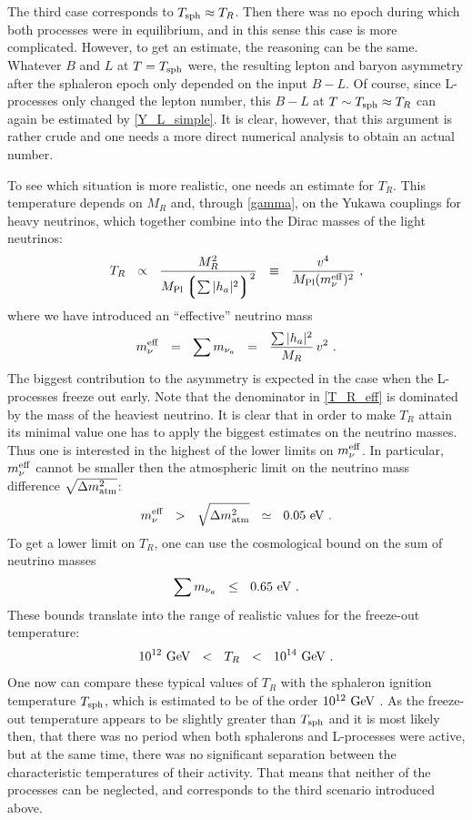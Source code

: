 \documentclass[12pt]{revtex4}
\newcommand{\lgr}{\left\lgroup}
\newcommand{\rgr}{\right\rgroup}
\newcommand{\Mpl}{M_{\rm Pl}}
\newcommand{\Tsph}{T_{\rm sph}}
\newcommand{\meff}{m^{\rm eff}_\nu}
\newcommand{\GeV}{{\rm GeV}}
\newcommand{\eV}{{\rm eV}}
\begin{document}
	The third case corresponds to $ \Tsph \approx T_R $.
	Then there was no epoch during which both processes
	were in equilibrium, and in this sense this case is more complicated.
	However, to get an estimate, the reasoning can be 
	the same.
	Whatever $ B $ and $ L $ at $ T = \Tsph $ were, the resulting
	lepton and baryon asymmetry after the sphaleron epoch only
	depended on the input $ B - L $.
	Of course, since L-processes only changed the lepton number,
	this $ B - L $ at  $ T \sim \Tsph \approx T_R $ can 
	again be estimated by \eqref{Y_L_simple}.
	It is clear, however, that this argument is rather crude and 
	one needs a more direct numerical analysis to obtain an actual
	number.

	To see which situation is more realistic, one needs an estimate
	for $ T_R $. 
	This temperature depends on $ M_R $ and, through \eqref{gamma},
	on the Yukawa couplings for heavy neutrinos, which together 
	combine into the Dirac masses of the light neutrinos:
\begin{equation}
\label{T_R_eff}
	T_R  ~~\propto~~ \frac{M_R^2}{\Mpl \lgr \sum |h_a|^2 \rgr^2}
		~~\equiv~~ \frac{v^4}{\Mpl (\meff)^2}~,
\end{equation}
	where we have introduced an ``effective'' neutrino mass
\[
	\meff ~~=~~ \sum m_{\nu_a} ~~=~~ \frac{\sum |h_a|^2}{M_R}\,v^2~.
\]
	The biggest contribution to the asymmetry is expected in the case
	when the L-processes freeze out early. 
	Note that the denominator in \eqref{T_R_eff} is dominated by the mass
	of the heaviest neutrino.
	It is clear that in order to make $ T_R $  attain its minimal
	value one has to apply the biggest estimates on the neutrino masses.
	Thus one is interested in the highest of the lower limits on
	$ \meff $.
	In particular, $ \meff $ cannot be smaller then the atmospheric limit
	on the neutrino mass difference $ \sqrt{\Delta m_{\rm atm}^2}$:
\[
	\meff ~~>~~ \sqrt{\Delta m_{\rm atm}^2} ~~\simeq~~ 0.05~\eV~.
\]
	To get a lower limit on $ T_R $, one can use the cosmological
	bound on the sum of neutrino masses
\[
	\sum m_{\nu_a} ~~\leq~~ 0.65~\eV~.
\]
	These bounds translate into the range of realistic values for the
	freeze-out temperature:
\[
	10^{12}~\GeV ~~<~~ T_R ~~<~~ 10^{14}~\GeV~.
\]
	One now can compare these typical values of $ T_R $ with the 
	sphaleron ignition temperature $ \Tsph $, which is estimated
	to be of the order $ 10^{12}~\GeV $ 
\cite{Buchmuller:2005eh}.
	As the freeze-out temperature appears to be slightly greater
	than $ \Tsph $ and 	
	it is most likely then, that there was no period when
	both sphalerons and L-processes were active, but at the same
	time, there was no significant separation between the characteristic 
	temperatures of their activity.
	That means that neither of the processes can be neglected,
	and corresponds to the third scenario introduced above.
\end{document}
